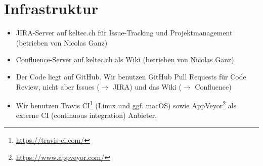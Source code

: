 \documentclass[a4paper]{article}
\let\oldsection\section
\renewcommand\section{\clearpage\oldsection}
\begin{document}
%
%
%
%

\section{Infrastruktur}
\begin{itemize}
  \item JIRA-Server auf keltec.ch für Issue-Tracking und Projektmanagement
    (betrieben von Nicolas Ganz)
  \item Confluence-Server auf keltec.ch als Wiki (betrieben von Nicolas Ganz)
  \item Der Code liegt auf GitHub.
    Wir benutzen GitHub Pull Requests für Code Review, nicht aber Issues ($\rightarrow$ JIRA)
    und das Wiki ($\rightarrow$ Confluence)
  \item Wir benutzen Travis CI\footnote{\url{https://travis-ci.com/}} (Linux und
    ggf. macOS) sowie AppVeyor\footnote{\url{https://www.appveyor.com/}} als
    externe CI (continuous integration) Anbieter.
\end{itemize}
\end{document}
